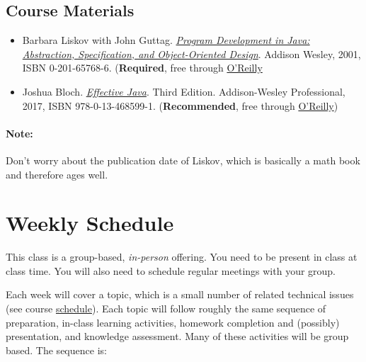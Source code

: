 \documentclass[11pt]{article}
\begin{document}
\subsection{Course Materials}
\begin{itemize}
  \item Barbara Liskov with John Guttag. \href{https://www.amazon.com/Program-Development-Java-Specification-Object-Oriented/dp/0201657686/ref=sr_1_2?dchild=1&qid=1626231221&refinements=p_27\%3ABarbara+Liskov&s=books&sr=1-2&text=Barbara+Liskov}{\emph{Program
  Development in Java: Abstraction, Specification, and Object-Oriented  Design}}. Addison Wesley, 2001, ISBN 0-201-65768-6.  (\textbf{Required}, free through \href{https://learning-oreilly-com.mutex.gmu.edu/library/view/program-development-in/9780768685299/ch1.html}{ O'Reilly}


\item Joshua Bloch.
\href{https://www.amazon.com/Effective-Java-Joshua-Bloch/dp/0134685997/ref=sr_1_1?dchild=1&keywords=effective+java&qid=1626231154&sr=8-1}{\emph{Effective
  Java}}. Third Edition. Addison-Wesley Professional, 2017, ISBN
  978-0-13-468599-1. (\textbf{Recommended}, free through
        \href{https://learning-oreilly-com.mutex.gmu.edu/library/view/effective-java-3rd/9780134686097/cover.xhtml}{O'Reilly})

\end{itemize}

\paragraph{Note:} Don't worry about the publication date of Liskov, which is basically a math book and therefore ages well.

\section{Weekly Schedule}



This class is a group-based, \emph{in-person} offering. You need to be
present in class at class time. You will also need to schedule regular
meetings with your group.

Each week will cover a topic, which is a small number of related
technical issues (see course \href{./schedule.html}{schedule}). Each
topic will follow roughly the same sequence of preparation, in-class
learning activities, homework completion and (possibly) presentation,
and knowledge assessment. Many of these activities will be group based.
The sequence is:
\end{document}
